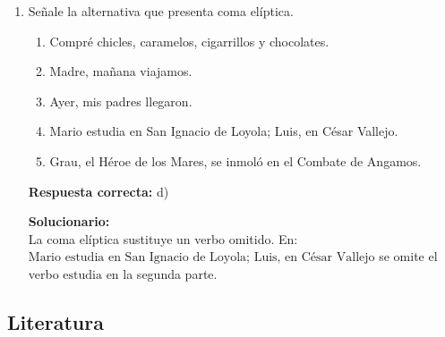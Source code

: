 \begin{enumerate}
	\vspace{2mm}
	\textbf{Solucionario:}\\
	La unidad mínima con sentido completo, autonomía y estructura sintáctica propia es la \textbf{oración}.
	
	\vspace{6mm}
	
	\item Señale la alternativa que presenta coma elíptica.
	\begin{enumerate}[label=\alph*)]
		\item Compré chicles, caramelos, cigarrillos y chocolates.
		\item Madre, mañana viajamos.
		\item Ayer, mis padres llegaron.
		\item Mario estudia en San Ignacio de Loyola; Luis, en César Vallejo.
		\item Grau, el Héroe de los Mares, se inmoló en el Combate de Angamos.
	\end{enumerate}
	\textbf{Respuesta correcta:} d)
	
	\vspace{2mm}
	\textbf{Solucionario:}\\
	La coma elíptica sustituye un verbo omitido. En:
	$ \text{Mario estudia en San Ignacio de Loyola; Luis, en César Vallejo} $
	se omite el verbo $ \text{estudia} $ en la segunda parte.
	
	\vspace{6mm}
\end{enumerate}


\subsection*{Literatura}

